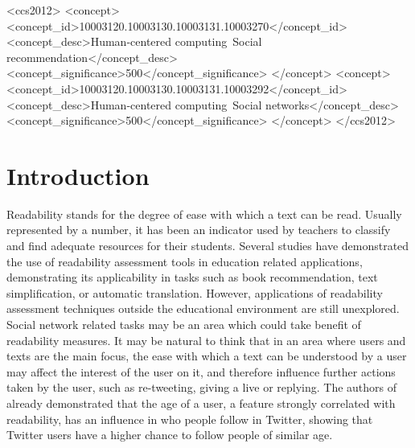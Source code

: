 \documentclass{sig-alternate-05-2015}
\begin{document}
%
%
 \begin{CCSXML}
<ccs2012>
<concept>
<concept_id>10003120.10003130.10003131.10003270</concept_id>
<concept_desc>Human-centered computing~Social recommendation</concept_desc>
<concept_significance>500</concept_significance>
</concept>
<concept>
<concept_id>10003120.10003130.10003131.10003292</concept_id>
<concept_desc>Human-centered computing~Social networks</concept_desc>
<concept_significance>500</concept_significance>
</concept>
</ccs2012>
\end{CCSXML}


%
%

%
%
\printccsdesc



\section{Introduction}

Readability stands for the degree of ease with which a text can be read. Usually represented by a number, it has been an indicator used by teachers to classify and find adequate resources for their students. Several studies have demonstrated the use of readability assessment tools in education related applications, demonstrating its applicability in tasks such as book recommendation, text simplification, or automatic translation. However, applications of readability assessment techniques outside the educational environment are still unexplored. Social network related tasks may be an area which could take benefit of readability measures. It may be natural to think that in an area where users and texts are the main focus, the ease with which a text can be understood by a user may affect the interest of the user on it, and therefore influence further actions taken by the user, such as re-tweeting, giving a live or replying. The authors of \cite{age} already demonstrated that the   age of a user, a feature strongly correlated with readability, has an influence in who people follow in Twitter, showing that Twitter users have a higher chance to follow people of similar age.
\end{document}
